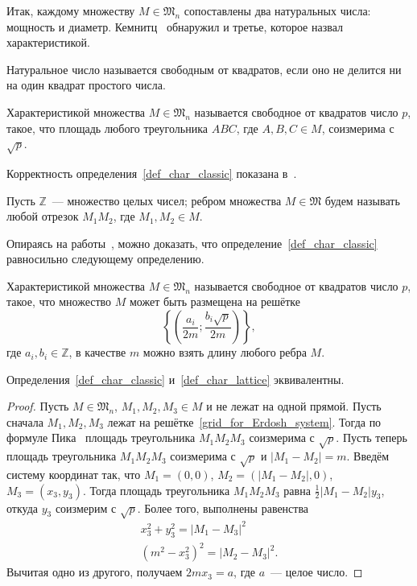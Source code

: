 Итак, каждому множеству $M\in\mathfrak{M}_n$ сопоставлены
два натуральных числа: мощность и диаметр.
Кемнитц~\cite{kemnitz1988punktmengen} обнаружил и третье,
которое назвал характеристикой.

\begin{definition}
	\cite[гл. 34, п. 3]{Bukhstab-number-theory}
	Натуральное число называется свободным от квадратов,
	если оно не делится ни на один квадрат простого числа.
\end{definition}

\begin{definition}
	\label{def_char_classic}
	Характеристикой множества $M\in\mathfrak{M}_n$ называется свободное от квадратов
	число $p$, такое, что площадь любого треугольника $ABC$, где $A,B,C\in M$,
	соизмерима с $\sqrt{p}$.
\end{definition}

Корректность определения~\ref{def_char_classic} показана в~\cite{kemnitz1988punktmengen}.

Пусть $\mathbb{Z}$~--- множество целых чисел;
ребром множества $M\in\mathfrak{M}$
будем называть любой отрезок $M_1 M_2$,
где $M_1, M_2 \in M$.

Опираясь на работы~\cite{our-mkmitu-2016,our-ped-2017},
можно доказать, что определение~\ref{def_char_classic} равносильно следующему определению.
\begin{definition}
	\label{def_char_lattice}
	Характеристикой множества $M\in\mathfrak{M}_n$ называется свободное от квадратов
	число $p$, такое, что множество $M$ может быть размещена на решётке
\begin{equation}\label{grid_for_Erdosh_system}
	\left\{\left(
		\frac{a_i}{2m}
		;
		\frac{b_i\sqrt{p}}{2m}
	\right)\right\},
\end{equation}
где $a_i, b_i \in \mathbb{Z}$,
в качестве $m$ можно взять длину любого ребра $M$.
\end{definition}

\begin{theorem}
	Определения~\ref{def_char_classic} и~\ref{def_char_lattice} эквивалентны.
\end{theorem}
\begin{proof}
	Пусть $M\in\mathfrak{M}_n$, $M_1,M_2,M_3 \in M$ и не лежат на одной прямой.
	Пусть сначала $M_1,M_2,M_3$ лежат на решётке~\eqref{grid_for_Erdosh_system}.
	Тогда по формуле Пика~\cite[теорема 3.1]{polygons-on-lattices} площадь треугольника $M_1 M_2 M_3$
	соизмерима с $\sqrt{p}$.
	Пусть теперь площадь треугольника $M_1 M_2 M_3$ соизмерима с $\sqrt{p}$ и $|M_1 - M_2|=m$.
	Введём систему координат так, что $M_1 = (0,0)$,
	$M_2 = (|M_1 - M_2|, 0)$,
	$M_3 = (x_3, y_3)$.
	Тогда площадь треугольника $M_1 M_2 M_3$ равна $\frac{1}{2} |M_1 - M_2| y_3$,
	откуда $y_3$ соизмерим с $\sqrt{p}$.
	Более того, выполнены равенства
	\begin{gather*}
		x_3^2 + y_3^2 = |M_1 - M_3|^2
		\\
		(m^2 - x_3^2)^2 = |M_2 - M_3|^2
		.
	\end{gather*}
	Вычитая одно из другого, получаем $2mx_3 = a$, где $a$~--- целое число.
\end{proof}


